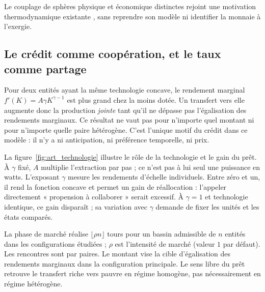
Le couplage de sphères physique et économique distinctes rejoint une
motivation thermodynamique existante \cite{herbert}, sans reprendre son modèle
ni identifier la monnaie à l'exergie.

\subsection{Le crédit comme coopération, et le taux comme partage}
\label{sec:credit}

Pour deux entités ayant la même technologie concave, le rendement marginal
$f'(K)=A\gamma K^{\gamma-1}$ est plus grand chez la moins dotée.
Un transfert vers elle augmente donc la production \emph{jointe} tant qu'il
ne dépasse pas l'égalisation des rendements marginaux. Ce résultat ne vaut
pas pour n'importe quel montant ni pour n'importe quelle paire hétérogène. C'est
l'unique motif du crédit dans ce modèle : il n'y a ni anticipation, ni
préférence temporelle, ni prix.

La figure~\ref{fig:art_technologie} illustre le rôle de la technologie et
le gain du prêt. À $\gamma$ fixé, $A$ multiplie l'extraction par pas ;
ce n'est pas à lui seul une puissance en watts. L'exposant $\gamma$
mesure les rendements d'échelle individuels. Entre zéro et un, il rend la
fonction concave et permet un gain de réallocation : l'appeler directement
« propension à collaborer » serait excessif. À $\gamma=1$ et technologie
identique, ce gain disparaît ; sa variation avec $\gamma$ demande de fixer
les unités et les états comparés.


La phase de marché réalise $\lfloor\rho n\rfloor$ tours pour un bassin
admissible de $n$ entités dans les configurations étudiées ; $\rho$ est
l'intensité de marché (valeur $1$ par défaut). Les rencontres sont par paires.
Le montant vise la cible d'égalisation des rendements marginaux dans la
configuration principale. Le sens libre du prêt retrouve le transfert
riche vers pauvre en régime homogène, pas nécessairement en régime hétérogène.

